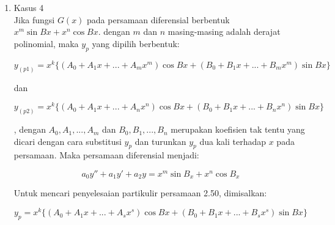 \begin{enumerate}[1.]
	\item Kasus 4 \\

	Jika fungsi \begin{math} G(x) \end{math} pada persamaan diferensial berbentuk \begin{math} x^{m} \sin Bx + x^{n} \cos Bx \end{math}. dengan \begin{math} m \end{math} dan \begin{math} n \end{math} masing-masing adalah derajat polinomial, maka \begin{math} y_p \end{math} yang dipilih berbentuk:

	\begin{displaymath} y_(p1) = x^{k} \bigg\{ (A_0 + A_1 x + ... + A_m x^{m}) \cos Bx + (B_0 + B_1 x + ... + B_m x^{m}) \sin Bx \bigg\} \end{displaymath}

	dan

	\begin{displaymath} y_(p2) = x^{k} \bigg\{ (A_0 + A_1 x + ... + A_n x^{n}) \cos Bx + (B_0 + B_1 x + ... + B_n x^{n}) \sin Bx \bigg\} \end{displaymath}

	, dengan \begin{math} A_0, A_1, ..., A_m \end{math} dan \begin{math} B_0, B_1, ..., B_n \end{math} merupakan koefisien tak tentu yang dicari dengan cara substitusi \begin{math} y_p \end{math} dan turunkan \begin{math} y_p \end{math} dua kali terhadap \begin{math} x \end{math} pada persamaan. Maka persamaan diferensial menjadi:

	\begin{equation} a_0 y'' + a_1 y' + a_2 y = x^{m} \sin B_x + x^{n} \cos B_x \end{equation}

	Untuk mencari penyelesaian partikulir persamaan 2.50, dimisalkan:

	\begin{displaymath} y_p = x^{k} \bigg\{ (A_0 + A_1 x + ... + A_s x^{s}) \cos Bx + (B_0 + B_1 x + ... + B_s x^{s}) \sin Bx \bigg\}  \end{displaymath}


\end{enumerate}
